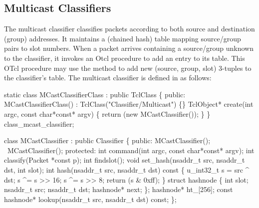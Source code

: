 {\subsection{Multicast Classifiers}{
\label{sec:node:mcast-classifier}

The multicast classifier classifies packets
according to both source and destination (group) addresses.
It maintains a (chained hash) table mapping source/group pairs to slot numbers.
When a packet arrives containing a source/group unknown to the classifier,
it invokes an Otcl procedure 
to add an entry to its table.
This OTcl procedure may use the method  to add
new (source, group, slot) 3-tuples to the classifier's table.
The multicast classifier is defined in 
as follows:
\begin{program}
        static class MCastClassifierClass : public TclClass \{
        public:
                MCastClassifierClass() : TclClass("Classifier/Multicast") \{\}
                TclObject* create(int argc, const char*const* argv) \{
                        return (new MCastClassifier());
                \}
        \} class_mcast_classifier;

        class MCastClassifier : public Classifier \{
        public:
                MCastClassifier();
                ~MCastClassifier();
        protected:
                int command(int argc, const char*const* argv);
                int classify(Packet *const p);
                int findslot();
                void set_hash(nsaddr_t src, nsaddr_t dst, int slot);
                int hash(nsaddr_t src, nsaddr_t dst) const \{
                        u_int32_t s = src ^ dst;
                        s ^= s >> 16;
                        s ^= s >> 8;
                        return (s & 0xff);
                \}
                struct hashnode \{
                        int slot;
                        nsaddr_t src;
                        nsaddr_t dst;
                        hashnode* next;
                \};
                hashnode* ht_[256];
                const hashnode* lookup(nsaddr_t src, nsaddr_t dst) const;
        \};


\end{program}}}
